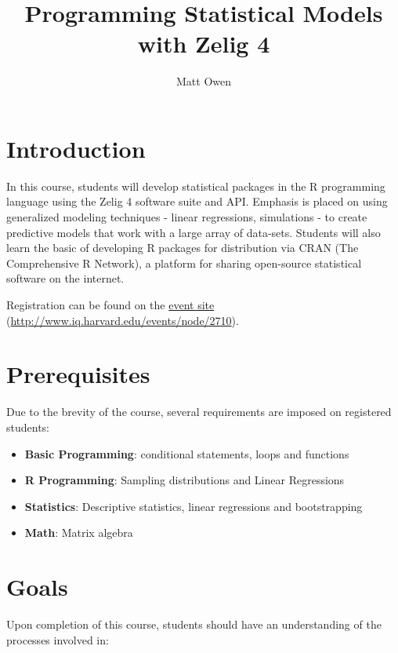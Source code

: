 \documentclass{article}
\title{Programming Statistical Models with Zelig 4}
\author{Matt Owen}
\begin{document}
\maketitle


\section{Introduction}
\label{intro}

In this course, students will develop statistical packages in the R programming 
language using the Zelig 4 software suite and API. Emphasis is placed on using 
generalized modeling techniques - linear regressions, simulations - to create 
predictive models that work with a large array of data-sets. Students will also 
learn the basic of developing R packages for distribution via CRAN 
(The Comprehensive R Network), a platform for sharing open-source statistical 
software on the internet.

Registration can be found on the \href{http://www.iq.harvard.edu/events/node/2710}{event site}
(\url{http://www.iq.harvard.edu/events/node/2710}).



\section{Prerequisites}
\label{prereq}

Due to the brevity of the course, several requirements are imposed on registered
students:

\begin{itemize}
  \item {\bf Basic Programming}: conditional statements, loops and functions
  \item {\bf R Programming}: Sampling distributions and Linear Regressions
  \item {\bf Statistics}: Descriptive statistics, linear regressions and bootstrapping
  \item {\bf Math}: Matrix algebra
\end{itemize}



\section{Goals}
\label{goals}

Upon completion of this course, students should have an understanding of the processes
involved in:
\end{document}
